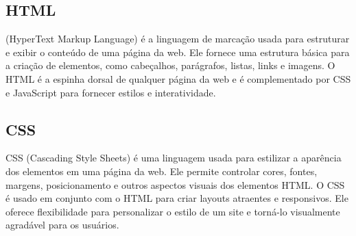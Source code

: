 \subsection{HTML}
(HyperText Markup Language) é a linguagem de marcação usada para estruturar e exibir o conteúdo de uma página da web. Ele fornece uma estrutura básica para a criação de elementos, como cabeçalhos, parágrafos, listas, links e imagens. O HTML é a espinha dorsal de qualquer página da web e é complementado por CSS e JavaScript para fornecer estilos e interatividade.

\subsection{CSS}
CSS (Cascading Style Sheets) é uma linguagem usada para estilizar a aparência dos elementos em uma página da web. Ele permite controlar cores, fontes, margens, posicionamento e outros aspectos visuais dos elementos HTML. O CSS é usado em conjunto com o HTML para criar layouts atraentes e responsivos. Ele oferece flexibilidade para personalizar o estilo de um site e torná-lo visualmente agradável para os usuários. 










